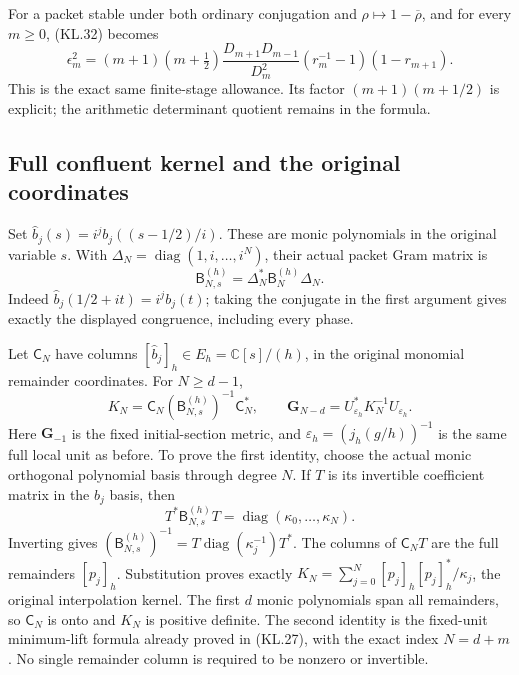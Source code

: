 For a packet stable under both ordinary conjugation and
\(\rho\mapsto1-\overline\rho\), and for every \(m\geq0\),
(KL.32) becomes
\[
 \boxed{\epsilon_m^2=(m+1)(m+\tfrac12)
       \frac{D_{m+1}D_{m-1}}{D_m^2}
           (r_m^{-1}-1)(1-r_{m+1}).}
                                                               \tag{TG.19}
\]
This is the exact same finite-stage allowance.  Its factor
\((m+1)(m+1/2)\) is explicit; the arithmetic determinant
quotient remains in the formula.

\subsection{Full confluent kernel and the original coordinates}

Set \(\widehat b_j(s)=i^j b_j((s-1/2)/i)\).  These are monic
polynomials in the original variable \(s\).  With
\(\Delta_N=\operatorname{diag}(1,i,\ldots,i^N)\),
their actual packet Gram matrix is
\[
 \mathsf B_{N,s}^{(h)}=\Delta_N^*
                  \mathsf B_N^{(h)}\Delta_N.
                                                               \tag{TG.20}
\]
Indeed \(\widehat b_j(1/2+it)=i^j b_j(t)\); taking the
conjugate in the first argument gives exactly the displayed
congruence, including every phase.

Let \(\mathsf C_N\) have columns
\([\widehat b_j]_h\in E_h=\mathbb{C}[s]/(h)\), in the original
monomial remainder coordinates.  For \(N\geq d-1\),
\[
 \boxed{K_N=\mathsf C_N(\mathsf B_{N,s}^{(h)})^{-1}
                           \mathsf C_N^*,\qquad
  \mathbf G_{N-d}=U_{\varepsilon_h}^*K_N^{-1}
                           U_{\varepsilon_h}.}
                                                               \tag{TG.21}
\]
Here \(\mathbf G_{-1}\) is the fixed initial-section metric,
and \(\varepsilon_h=(j_h(g/h))^{-1}\) is the same full local
unit as before.  To prove the first identity, choose the actual
monic orthogonal polynomial basis through degree \(N\).  If
\(T\) is its invertible coefficient matrix in the
\(\widehat b_j\) basis, then
\[
 T^*\mathsf B_{N,s}^{(h)}T
     =\operatorname{diag}(\kappa_0,\ldots,\kappa_N).
\]
Inverting gives
\((\mathsf B_{N,s}^{(h)})^{-1}
 =T\operatorname{diag}(\kappa_j^{-1})T^*\).
The columns of \(\mathsf C_NT\) are the full remainders
\([p_j]_h\).  Substitution proves exactly
\(K_N=\sum_{j=0}^N[p_j]_h[p_j]_h^*/\kappa_j\), the original
interpolation kernel.  The first \(d\) monic polynomials span all
remainders, so \(\mathsf C_N\) is onto and \(K_N\) is positive
definite.  The second identity is the fixed-unit minimum-lift
formula already proved in (KL.27), with the exact index
\(N=d+m\).  No single remainder column is required to be nonzero
or invertible.

